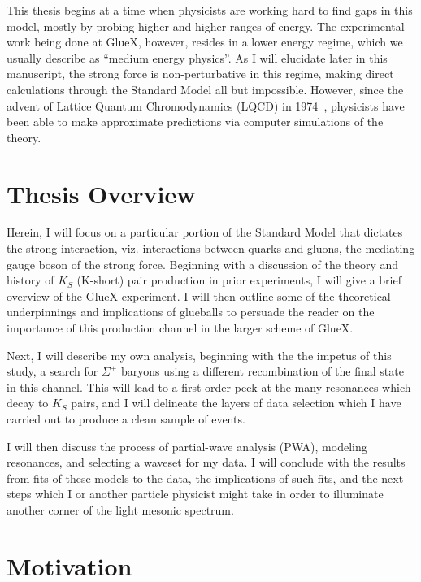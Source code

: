 This thesis begins at a time when physicists are working hard to find gaps in this model, mostly by probing higher and higher ranges of energy. The experimental work being done at GlueX, however, resides in a lower energy regime, which we usually describe as ``medium energy physics''. As I will elucidate later in this manuscript, the strong force is non-perturbative in this regime, making direct calculations through the Standard Model all but impossible. However, since the advent of Lattice Quantum Chromodynamics (LQCD) in 1974~\cite{wilson_confinement_1974}, physicists have been able to make approximate predictions via computer simulations of the theory.

\section{Thesis Overview}\label{sec:thesis_overview}

Herein, I will focus on a particular portion of the Standard Model that dictates the strong interaction, viz. interactions between quarks and gluons, the mediating gauge boson of the strong force. Beginning with a discussion of the theory and history of $K_S$ (K-short) pair production in prior experiments, I will give a brief overview of the GlueX experiment. I will then outline some of the theoretical underpinnings and implications of glueballs to persuade the reader on the importance of this production channel in the larger scheme of GlueX.

Next, I will describe my own analysis, beginning with the the impetus of this study, a search for $\Sigma^+$ baryons using a different recombination of the final state in this channel. This will lead to a first-order peek at the many resonances which decay to $K_S$ pairs, and I will delineate the layers of data selection which I have carried out to produce a clean sample of events.

I will then discuss the process of partial-wave analysis (PWA), modeling resonances, and selecting a waveset for my data. I will conclude with the results from fits of these models to the data, the implications of such fits, and the next steps which I or another particle physicist might take in order to illuminate another corner of the light mesonic spectrum.

\section{Motivation}\label{sec:motivation}

